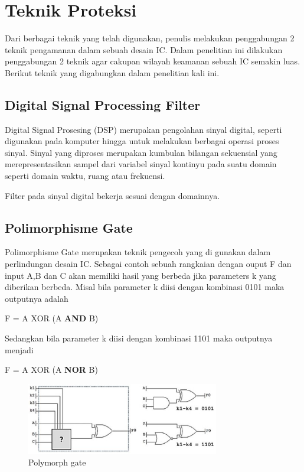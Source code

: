 \section{Teknik Proteksi}
Dari berbagai teknik yang telah digunakan, penulis melakukan penggabungan 2 teknik pengamanan dalam sebuah desain IC. Dalam penelitian ini dilakukan penggabungan 2 teknik agar cakupan wilayah keamanan sebuah IC semakin luas. Berikut teknik yang digabungkan dalam penelitian kali ini.

\subsection{Digital Signal Processing Filter}
Digital Signal Prosesing (DSP) merupakan pengolahan sinyal digital, seperti digunakan pada komputer hingga untuk melakukan berbagai operasi proses sinyal. Sinyal yang diproses merupakan kumbulan bilangan sekuensial yang merepresentasikan sampel dari variabel sinyal kontinyu pada suatu domain seperti domain waktu, ruang atau frekuensi.

Filter pada sinyal digital bekerja sesuai dengan domainnya.

\subsection{Polimorphisme Gate}
Polimorphisme Gate merupakan teknik pengecoh yang di gunakan dalam perlindungan desain IC. Sebagai contoh sebuah rangkaian dengan ouput F dan input A,B dan C akan memiliki hasil yang berbeda jika parameters k yang diberikan berbeda. Misal bila parameter k diisi dengan kombinasi 0101 maka outputnya adalah
\begin{center}
	F = A XOR (A \textbf{AND} B)
\end{center}
Sedangkan bila parameter k diisi dengan kombinasi 1101 maka outputnya menjadi
\begin{center}
	F = A XOR (A \textbf{NOR} B)
\end{center}

\begin{figure}
	\centering
	\includegraphics[width=0.75\textwidth]
	{pics/polymorphgate.png}
	\caption{Polymorph gate}
	\label{fig:poly}
\end{figure}

